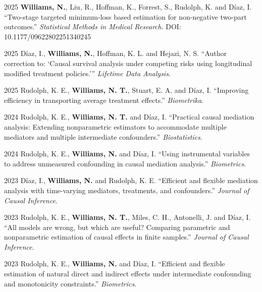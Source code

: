 \documentclass[12pt,letterpaper]{report}
\begin{document}
    \begin{tablist}
   
    \item[2025] \tab \textbf{Williams, N.}, Liu, R., Hoffman, K., Forrest, S., Rudolph, K. and Díaz, I. \enquote{Two-stage targeted minimum-loss based estimation for non-negative two-part outcomes.} \textit{Statistical Methods in Medical Research}. DOI: 10.1177/09622802251340245
    
    \item[2025] \tab Díaz, I., \textbf{Williams, N.}, Hoffman, K. L. and Hejazi, N. S. \enquote{Author correction to: `Causal survival analysis under competing risks using longitudinal modified treatment policies.'} \textit{Lifetime Data Analysis}.
    
    \item[2025] \tab Rudolph, K. E., \textbf{Williams, N. T.}, Stuart, E. A. and Díaz, I. \enquote{Improving efficiency in transporting average treatment effects.} \textit{Biometrika}.
    
    \item[2024] \tab Rudolph, K. E., \textbf{Williams, N. T.} and Díaz, I. \enquote{Practical causal mediation analysis: Extending nonparametric estimators to accommodate multiple mediators and multiple intermediate confounders.} \textit{Biostatistics}.
    
    \item[2024] \tab Rudolph, K. E., \textbf{Williams, N.} and Díaz, I. \enquote{Using instrumental variables to address unmeasured confounding in causal mediation analysis.} \textit{Biometrics}.
    
    \item[2023] \tab Díaz, I., \textbf{Williams, N.} and Rudolph, K. E. \enquote{Efficient and flexible mediation analysis with time-varying mediators, treatments, and confounders.} \textit{Journal of Causal Inference}.
    
    \item[2023] \tab Rudolph, K. E., \textbf{Williams, N. T.}, Miles, C. H., Antonelli, J. and Díaz, I. \enquote{All models are wrong, but which are useful? Comparing parametric and nonparametric estimation of causal effects in finite samples.} \textit{Journal of Causal Inference}.
    
    \item[2023] \tab Rudolph, K. E., \textbf{Williams, N.} and Díaz, I. \enquote{Efficient and flexible estimation of natural direct and indirect effects under intermediate confounding and monotonicity constraints.} \textit{Biometrics}.
    

\end{tablist}
\end{document}
